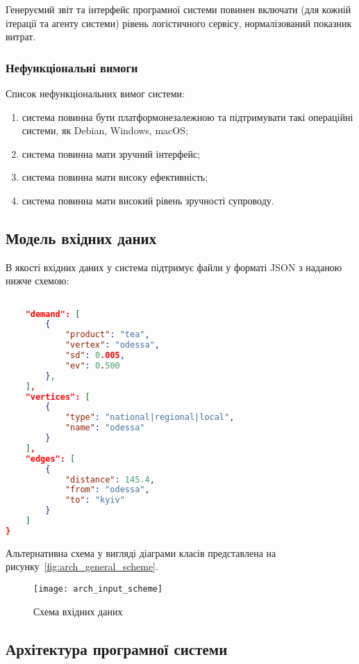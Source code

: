 Генеруємий звіт та інтерфейс програмної системи повинен включати (для кожній ітерації та агенту системи) рівень логістичного сервісу, нормалізований показник витрат.

\subsubsection{Нефункціональні вимоги}
Список нефункціональних вимог системи:
\begin{enumerate}[label={\arabic*)}]
	\item система повинна бути платформонезалежною та підтримувати такі операційні системи, як Debian, Windows, macOS;
	\item система повинна мати зручний інтерфейс;
	\item система повинна мати високу ефективність;
	\item система повинна мати високий рівень зручності супроводу.
\end{enumerate}

\subsection{Модель вхідних даних}
В якості вхідних даних у система підтримує файли у форматі JSON з наданою нижче схемою: 

{\small
\begin{lstlisting}[language=json,firstnumber=1]

	"demand": [
		{
			"product": "tea",
			"vertex": "odessa",
			"sd": 0.005,
			"ev": 0.500
		},
	],
	"vertices": [
		{
			"type": "national|regional|local",
			"name": "odessa"
		}
	],
	"edges": [
		{
			"distance": 145.4,
			"from": "odessa",
			"to": "kyiv"
		}
	]
}
\end{lstlisting}
}

Альтернативна схема у вигляді діаграми класів представлена на рисунку~\ref{fig:arch_general_scheme}.

\begin{figure}[H]
	\centering
	\texttt{[image: arch\_input\_scheme]}
	\caption{Схема вхідних даних}
	\label{fig:arch_input_scheme}
\end{figure}  

\subsection{Архітектура програмної системи}
